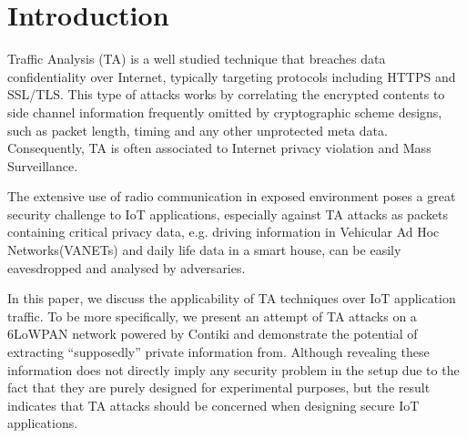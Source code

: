 \section{Introduction}
Traffic Analysis (TA) is a well studied technique that breaches data confidentiality over Internet, typically targeting protocols including HTTPS\cite{rfc2818} and SSL\cite{rfc6101}/TLS\cite{rfc5246}. This type of attacks works by correlating the encrypted contents to side channel information frequently omitted by cryptographic scheme designs, such as packet length, timing and any other unprotected meta data. Consequently, TA is often associated to Internet privacy violation and Mass Surveillance.

The extensive use of radio communication in exposed environment poses a great security challenge to IoT applications, especially against TA attacks as packets containing critical privacy data, e.g. driving information in Vehicular Ad Hoc Networks(VANETs)\cite{VANET} and daily life data in a smart house, can be easily eavesdropped and analysed by adversaries.

In this paper, we discuss the applicability of TA techniques over IoT application traffic. To be more specifically, we present an attempt of TA attacks on a 6LoWPAN\cite{rfc4944} network powered by Contiki\cite{Contiki} and demonstrate the potential of extracting ``supposedly'' private information from. Although revealing these information does not directly imply any security problem in the setup due to the fact that they are purely designed for experimental purposes, but the result indicates that TA attacks should be concerned when designing secure IoT applications.


